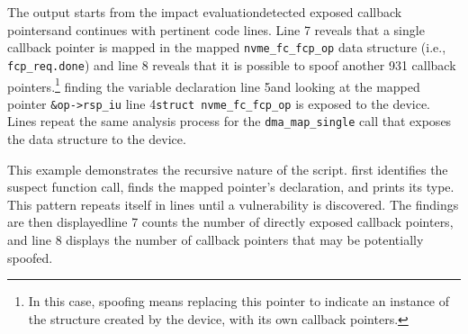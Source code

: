 The output starts from the impact evaluation\DIFdelbegin {}\DIFdelend \DIFaddbegin {}\DIFaddend detected exposed callback pointers\DIFdelbegin \DIFdel{) }\DIFdelend \DIFaddbegin \DIFadd{, }\DIFaddend and continues with pertinent code lines. %
Line 7 reveals that a single callback pointer is mapped in the mapped \texttt{nvme\_fc\_fcp\_op} data structure (i.e., \texttt{fcp\_req.done}) and line 8 reveals that it is possible to spoof another 931 callback pointers.\footnote{In this case, spoofing means replacing this pointer to indicate an instance of the structure created by the device, with its own callback pointers.}
\DIFdelbegin {}%
\DIFdelend \DIFaddbegin {}\DIFaddend finding the variable declaration \DIFdelbegin {}\DIFdelend \DIFaddbegin {}\DIFaddend line 5\DIFdelbegin \DIFdel{) }\DIFdelend \DIFaddbegin \DIFadd{, }\DIFaddend and looking at the mapped pointer \DIFdelbegin {}\DIFdelend \texttt{\&op->rsp\_iu} \DIFdelbegin {}\DIFdelend \DIFaddbegin {}\DIFaddend line 4\DIFdelbegin {}\DIFdelend \DIFaddbegin \DIFadd{, }\tool {}\DIFaddend \texttt{struct nvme\_fc\_fcp\_op} is exposed to the device. Lines \DIFdelbegin {}\DIFdelend \DIFaddbegin {}\DIFaddend repeat the same analysis process for the \texttt{dma\_map\_single} call that exposes the data structure to the device. 

This example demonstrates the recursive nature of the script.
\tool first identifies the suspect function call, \DIFdelbegin {}\DIFdelend finds the mapped pointer's declaration, and \DIFdelbegin {}\DIFdelend \DIFaddbegin {}\DIFaddend prints its type. This pattern repeats itself in lines \DIFdelbegin {}\DIFdelend \DIFaddbegin {}\DIFaddend until a vulnerability is discovered. The findings are then displayed\DIFdelbegin \DIFdel{; }\DIFdelend \DIFaddbegin \DIFadd{: }\DIFaddend line 7 counts the number of directly exposed callback pointers, and line 8 displays the number of callback pointers that may be potentially spoofed.



